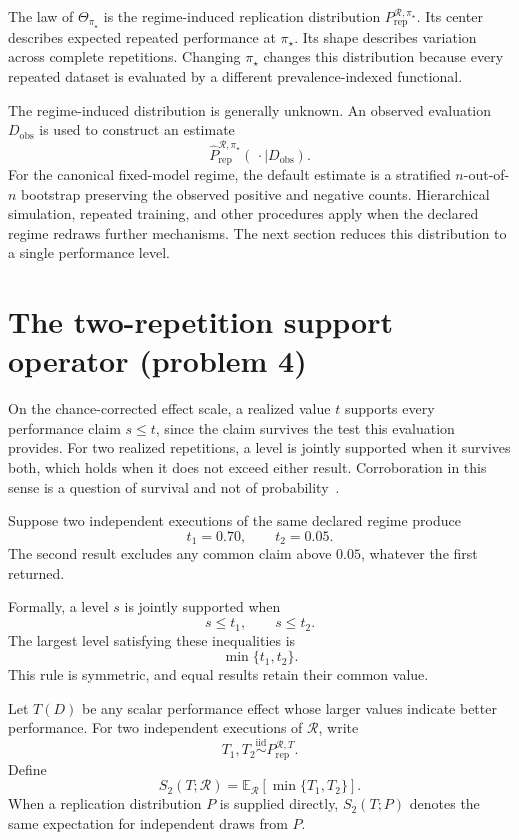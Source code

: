 \documentclass[11pt]{article}
\newcommand{\Regime}{\mathcal{R}}
\newcommand{\E}{\mathbb{E}}
\newcommand{\iid}{\mathrel{\overset{\mathrm{iid}}{\sim}}}
\newcommand{\PRep}{P_{\mathrm{rep}}^{\Regime,\pi_\star}}
\newcommand{\PRepHat}{\widehat{P}_{\mathrm{rep}}^{\Regime,\pi_\star}}
\theoremstyle{remark}
\begin{document}
The law of $\Theta_{\pi_\star}$ is the regime-induced replication distribution $\PRep$. Its center describes expected repeated performance at $\pi_\star$. Its shape describes variation across complete repetitions. Changing $\pi_\star$ changes this distribution because every repeated dataset is evaluated by a different prevalence-indexed functional.

The regime-induced distribution is generally unknown. An observed evaluation $D_{\mathrm{obs}}$ is used to construct an estimate
\[
\PRepHat(\,\cdot\mid D_{\mathrm{obs}}).
\]
For the canonical fixed-model regime, the default estimate is a stratified $n$-out-of-$n$ bootstrap preserving the observed positive and negative counts. Hierarchical simulation, repeated training, and other procedures apply when the declared regime redraws further mechanisms. The next section reduces this distribution to a single performance level.

\section{The two-repetition support operator (problem 4)}
\label{sec:support}

On the chance-corrected effect scale, a realized value $t$ supports every performance claim $s\leq t$, since the claim survives the test this evaluation provides. For two realized repetitions, a level is jointly supported when it survives both, which holds when it does not exceed either result. Corroboration in this sense is a question of survival and not of probability~\cite{popper1959logic}.

Suppose two independent executions of the same declared regime produce
\[
t_1=0.70,
\qquad
t_2=0.05.
\]
The second result excludes any common claim above $0.05$, whatever the first returned.

Formally, a level $s$ is jointly supported when
\[
s\leq t_1,
\qquad
s\leq t_2.
\]
The largest level satisfying these inequalities is
\[
\min\{t_1,t_2\}.
\]
This rule is symmetric, and equal results retain their common value.

Let $T(D)$ be any scalar performance effect whose larger values indicate better performance. For two independent executions of $\Regime$, write
\[
T_1,T_2
\iid
P_{\mathrm{rep}}^{\Regime,T}.
\]
Define
\begin{equation}
S_2(T;\Regime)
=
\E_{\Regime}[\min\{T_1,T_2\}].
\label{eq:support-operator}
\end{equation}
When a replication distribution $P$ is supplied directly, $S_2(T;P)$ denotes the same expectation for independent draws from $P$.
\end{document}
